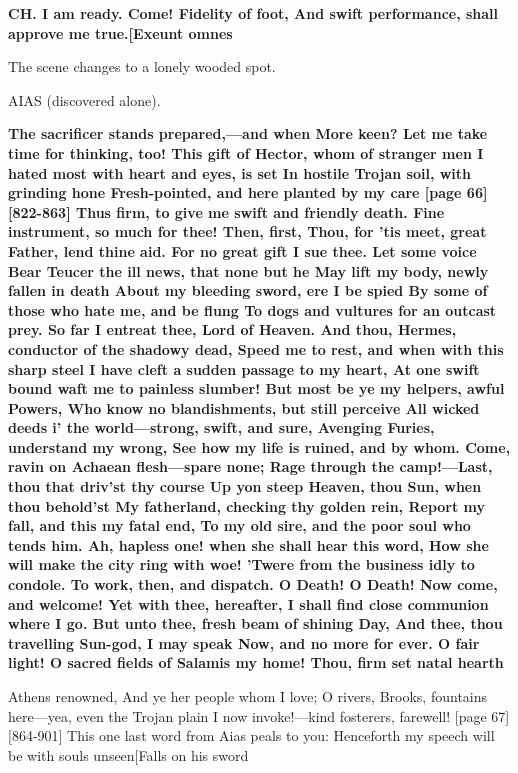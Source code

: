 \documentclass[11pt,letter]{book}
\begin{document}
\par \textbf{CH. I am ready. Come! Fidelity of foot, And swift performance, shall approve me true.[Exeunt omnes}
\par 

\par  The scene changes to a lonely wooded spot.

\par  AIAS (discovered alone).

\par \textbf{The sacrificer stands prepared,—and when More keen? Let me take time for thinking, too! This gift of Hector, whom of stranger men I hated most with heart and eyes, is set In hostile Trojan soil, with grinding hone Fresh-pointed, and here planted by my care [page 66][822-863] Thus firm, to give me swift and friendly death. Fine instrument, so much for thee! Then, first, Thou, for ’tis meet, great Father, lend thine aid. For no great gift I sue thee. Let some voice Bear Teucer the ill news, that none but he May lift my body, newly fallen in death About my bleeding sword, ere I be spied By some of those who hate me, and be flung To dogs and vultures for an outcast prey. So far I entreat thee, Lord of Heaven. And thou, Hermes, conductor of the shadowy dead, Speed me to rest, and when with this sharp steel I have cleft a sudden passage to my heart, At one swift bound waft me to painless slumber! But most be ye my helpers, awful Powers, Who know no blandishments, but still perceive All wicked deeds i’ the world—strong, swift, and sure, Avenging Furies, understand my wrong, See how my life is ruined, and by whom. Come, ravin on Achaean flesh—spare none; Rage through the camp!—Last, thou that driv’st thy course Up yon steep Heaven, thou Sun, when thou behold’st My fatherland, checking thy golden rein, Report my fall, and this my fatal end, To my old sire, and the poor soul who tends him. Ah, hapless one! when she shall hear this word, How she will make the city ring with woe! ’Twere from the business idly to condole. To work, then, and dispatch. O Death! O Death! Now come, and welcome! Yet with thee, hereafter, I shall find close communion where I go. But unto thee, fresh beam of shining Day, And thee, thou travelling Sun-god, I may speak Now, and no more for ever. O fair light! O sacred fields of Salamis my home! Thou, firm set natal hearth}
\par   Athens renowned, And ye her people whom I love; O rivers, Brooks, fountains here—yea, even the Trojan plain I now invoke!—kind fosterers, farewell! [page 67][864-901] This one last word from Aias peals to you:  Henceforth my speech will be with souls unseen[Falls on his sword
\end{document}
